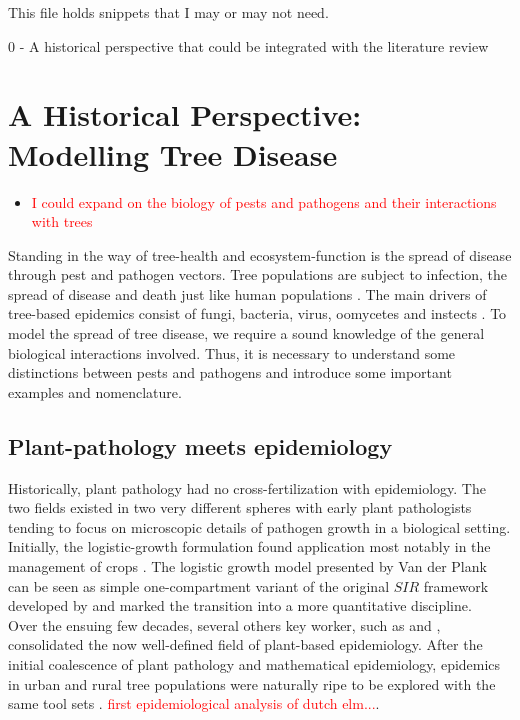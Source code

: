 This file holds snippets that I may or may not need.


0 - A historical perspective that could be integrated with the literature review
    \section{A Historical Perspective: Modelling Tree Disease}
    \begin{itemize}
        \item \textcolor{red}{I could expand on the biology of pests and pathogens and their interactions with trees}
    \end{itemize}
    Standing in the way of tree-health and ecosystem-function is the spread of disease through pest and pathogen vectors. Tree populations are subject to infection, the spread of disease and death just like human populations \cite{hethcote2000mathematics}. The main drivers of tree-based epidemics consist of fungi, bacteria, virus, oomycetes and instects \cite{manion1981tree}. To model the spread of tree disease, we require a sound knowledge of the general biological interactions involved. Thus, it is necessary to understand some distinctions between pests and pathogens and introduce some important examples and nomenclature.\\
    
    \subsection{Plant-pathology meets epidemiology}
    Historically, plant pathology had no cross-fertilization with epidemiology. The two fields existed in two very different spheres with early plant pathologists tending to focus on microscopic details of pathogen growth in a biological setting. Initially, the logistic-growth formulation found application most notably in the management of crops \cite{browning1969multiline}. The logistic growth model presented by Van der Plank can be seen as simple one-compartment variant of the original $SIR$ framework developed by \cite{kermack-model} and marked the transition into a more quantitative discipline.\\
    
    Over the ensuing few decades, several others key worker, such as \cite{zadoks1979epidemiology} and \cite{campbell1990introduction}, consolidated the now well-defined field of plant-based epidemiology. 
    After the initial coalescence of plant pathology and mathematical epidemiology, epidemics in urban and rural tree populations were naturally ripe to be explored with the same tool sets \cite{manion1981tree}. \textcolor{red}{first epidemiological analysis of dutch elm...}.
    
